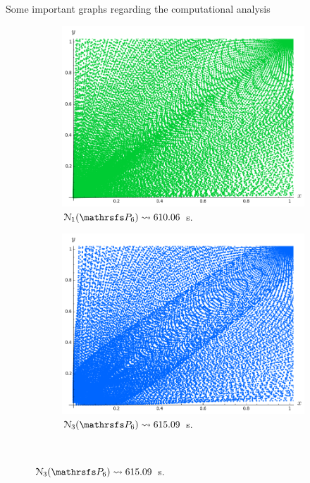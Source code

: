 \documentclass[final]{beamer}
\newlength{\twocolwid}
\begin{document}
\begin{frame}[t]
\begin{columns}[t]
\begin{column}{\twocolwid}
\begin{alertblock}{Some important graphs regarding the computational analysis}
\begin{center}
\begin{figure}
\begin{subfigure}{.28\linewidth}
\includegraphics[width=1\textwidth]{plots/ch5_new1_P6prime.png}
\vspace{-0.1cm}\caption{$\mathcal{N}_1(\PP_6) \leadsto 610.06$ s.}
\end{subfigure}
\hspace{2cm}
\begin{subfigure}{.28\linewidth}\centering
\includegraphics[width=1\textwidth]{plots/ch5_new3_P6.png}
\vspace{-0.1cm}\caption{$\mathcal{N}_3(\PP_6)\leadsto 615.09$ s.}
\end{subfigure}\\[1ex]


\end{figure}
\end{center}
\end{alertblock}
\end{column}
\end{columns}
\end{frame}
\end{document}
